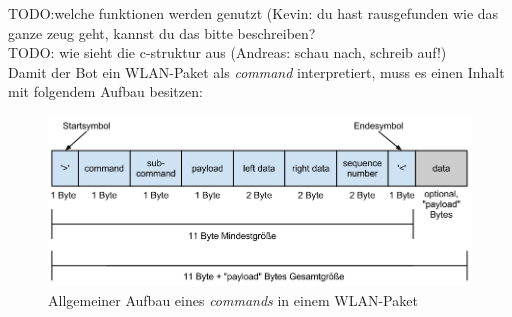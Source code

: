 TODO:welche funktionen werden genutzt (Kevin: du hast rausgefunden wie das ganze zeug geht, kannst du das bitte beschreiben?\\

TODO: wie sieht die c-struktur aus (Andreas: schau nach, schreib auf!)\\

Damit der Bot ein WLAN-Paket als \textit{command} interpretiert, muss es einen Inhalt mit folgendem Aufbau besitzen:
\begin{figure}[H]
	\centering
	\includegraphics[scale=0.5]{pic/ctBotWlanAllgemein}
	\caption{Allgemeiner Aufbau eines \textit{commands} in einem WLAN-Paket}
	\label{ctBotWlanAllgemein}
\end{figure}


